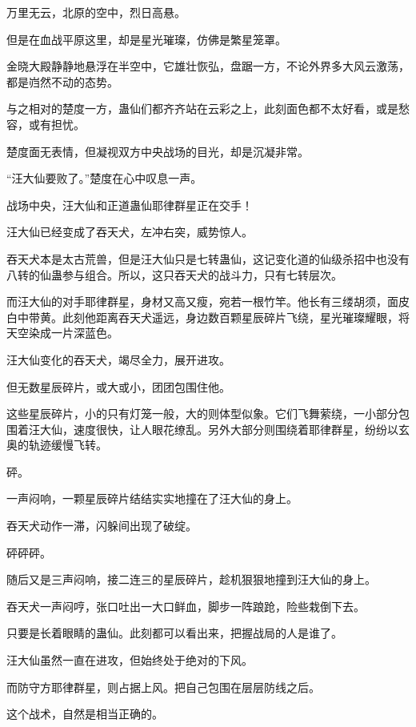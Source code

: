 
\begin{this_body}

万里无云，北原的空中，烈日高悬。

但是在血战平原这里，却是星光璀璨，仿佛是繁星笼罩。

金晓大殿静静地悬浮在半空中，它雄壮恢弘，盘踞一方，不论外界多大风云激荡，都是岿然不动的态势。

与之相对的楚度一方，蛊仙们都齐齐站在云彩之上，此刻面色都不太好看，或是愁容，或有担忧。

楚度面无表情，但凝视双方中央战场的目光，却是沉凝非常。

“汪大仙要败了。”楚度在心中叹息一声。

战场中央，汪大仙和正道蛊仙耶律群星正在交手！

汪大仙已经变成了吞天犬，左冲右突，威势惊人。

吞天犬本是太古荒兽，但是汪大仙只是七转蛊仙，这记变化道的仙级杀招中也没有八转的仙蛊参与组合。所以，这只吞天犬的战斗力，只有七转层次。

而汪大仙的对手耶律群星，身材又高又瘦，宛若一根竹竿。他长有三缕胡须，面皮白中带黄。此刻他距离吞天犬遥远，身边数百颗星辰碎片飞绕，星光璀璨耀眼，将天空染成一片深蓝色。

汪大仙变化的吞天犬，竭尽全力，展开进攻。

但无数星辰碎片，或大或小，团团包围住他。

这些星辰碎片，小的只有灯笼一般，大的则体型似象。它们飞舞萦绕，一小部分包围着汪大仙，速度很快，让人眼花缭乱。另外大部分则围绕着耶律群星，纷纷以玄奥的轨迹缓慢飞转。

砰。

一声闷响，一颗星辰碎片结结实实地撞在了汪大仙的身上。

吞天犬动作一滞，闪躲间出现了破绽。

砰砰砰。

随后又是三声闷响，接二连三的星辰碎片，趁机狠狠地撞到汪大仙的身上。

吞天犬一声闷哼，张口吐出一大口鲜血，脚步一阵踉跄，险些栽倒下去。

只要是长着眼睛的蛊仙。此刻都可以看出来，把握战局的人是谁了。

汪大仙虽然一直在进攻，但始终处于绝对的下风。

而防守方耶律群星，则占据上风。把自己包围在层层防线之后。

这个战术，自然是相当正确的。


\end{this_body}
